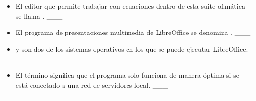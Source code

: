 \documentclass[letterpaper,10pt,spanish]{sphinxmanual}
\begin{document}
\begin{enumerate}
\begin{itemize}
\item {} 
\sphinxAtStartPar
El editor que permite trabajar con ecuaciones dentro de esta suite ofimática se llama . \_\_\_

\item {} 
\sphinxAtStartPar
El programa de presentaciones multimedia de LibreOffice se denomina . \_\_\_

\item {} 
\sphinxAtStartPar
{} y  son dos de los sistemas operativos en los que se puede ejecutar LibreOffice. \_\_\_

\item {} 
\sphinxAtStartPar
El término  significa que el programa solo funciona de manera óptima si se está conectado a una red de servidores local. \_\_\_

\end{itemize}

\end{enumerate}


\bigskip\hrule\bigskip
\end{document}
